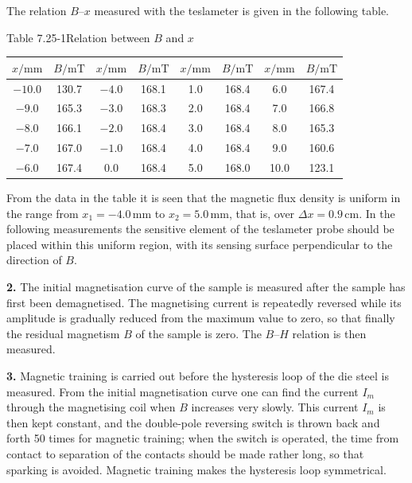 The relation $B$--$x$ measured with the teslameter is given in the following table.

\begin{center}
{\small Table 7.25-1\quad Relation between $B$ and $x$}\\[2pt]
\begin{tabular}{@{}cccccccc@{}}
\toprule
$x/\mathrm{mm}$ & $B/\mathrm{mT}$ & $x/\mathrm{mm}$ & $B/\mathrm{mT}$ & $x/\mathrm{mm}$ & $B/\mathrm{mT}$ & $x/\mathrm{mm}$ & $B/\mathrm{mT}$\\
\midrule
$-10.0$ & 130.7 & $-4.0$ & 168.1 & 1.0 & 168.4 & 6.0 & 167.4\\
$-9.0$  & 165.3 & $-3.0$ & 168.3 & 2.0 & 168.4 & 7.0 & 166.8\\
$-8.0$  & 166.1 & $-2.0$ & 168.4 & 3.0 & 168.4 & 8.0 & 165.3\\
$-7.0$  & 167.0 & $-1.0$ & 168.4 & 4.0 & 168.4 & 9.0 & 160.6\\
$-6.0$  & 167.4 & 0.0   & 168.4 & 5.0 & 168.0 & 10.0 & 123.1\\
\bottomrule
\end{tabular}
\end{center}

From the data in the table it is seen that the magnetic flux density is uniform in the range from $x_1=-4.0\,\mathrm{mm}$ to $x_2=5.0\,\mathrm{mm}$, that is, over $\Delta x=0.9\,\mathrm{cm}$. In the following measurements the sensitive element of the teslameter probe should be placed within this uniform region, with its sensing surface perpendicular to the direction of $B$.

\textbf{2.} The initial magnetisation curve of the sample is measured after the sample has first been demagnetised. The magnetising current is repeatedly reversed while its amplitude is gradually reduced from the maximum value to zero, so that finally the residual magnetism $B$ of the sample is zero. The $B$--$H$ relation is then measured.

\textbf{3.} Magnetic training is carried out before the hysteresis loop of the die steel is measured. From the initial magnetisation curve one can find the current $I_m$ through the magnetising coil when $B$ increases very slowly. This current $I_m$ is then kept constant, and the double-pole reversing switch is thrown back and forth 50 times for magnetic training; when the switch is operated, the time from contact to separation of the contacts should be made rather long, so that sparking is avoided. Magnetic training makes the hysteresis loop symmetrical.

